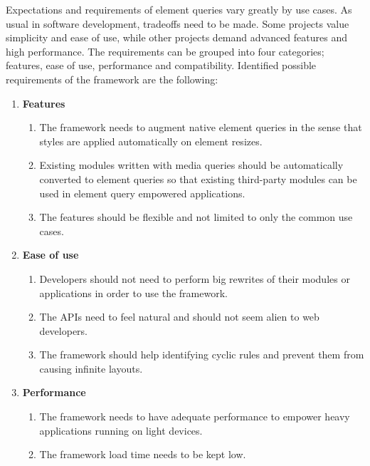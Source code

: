 \documentclass[a4paper,11pt]{kth-mag}
\begin{document}
        Expectations and requirements of element queries vary greatly by use cases.
        As usual in software development, tradeoffs need to be made.
        Some projects value simplicity and ease of use, while other projects demand advanced features and high performance.
        The requirements can be grouped into four categories; features, ease of use, performance and compatibility.
        Identified possible requirements of the framework are the following:
        \begin{enumerate}
          \item \textbf{Features}
            \begin{enumerate}
              \item\label{itm:req_resize_detect} The framework needs to augment \gls{native} element queries in the sense that styles are applied automatically on \gls{element} resizes.
              \item Existing modules written with \gls{media queries} should be automatically converted to element queries so that existing third-party modules can be used in element query empowered applications.
              \item The features should be flexible and not limited to only the common use cases.
            \end{enumerate}
          \item \textbf{Ease of use}
            \begin{enumerate}
              \item\label{itm:req_big_rewrite} Developers should not need to perform big rewrites of their modules or applications in order to use the framework.
              \item\label{itm:natural} The \glspl{API} need to feel natural and should not seem alien to \gls{web} developers.
              \item The framework should help identifying cyclic rules and prevent them from causing infinite layouts.
            \end{enumerate}
          \item \textbf{Performance}
            \begin{enumerate}
              \item The framework needs to have adequate performance to empower heavy applications running on light devices.
              \item The framework load time needs to be kept low.
            \end{enumerate}

\end{enumerate}
\end{document}

